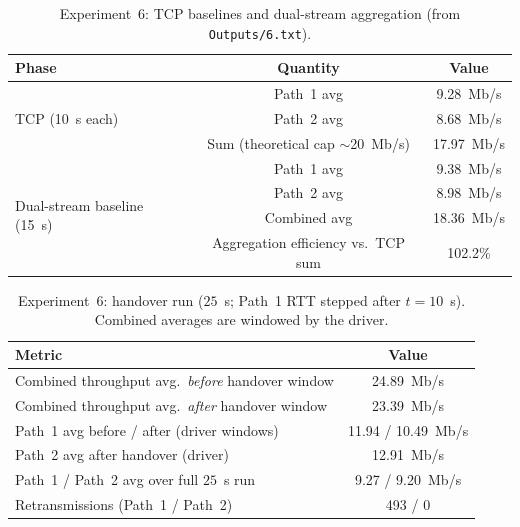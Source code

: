 \begin{table}[htbp]
  \centering
  \caption{Experiment~6: TCP baselines and dual-stream aggregation (from \texttt{Outputs/6.txt}).}
  \label{tab:exp6baseline}
  \begin{tabular}{lcc}
    \toprule
    Phase & Quantity & Value \\
    \midrule
    \multirow{3}{*}{TCP (10~s each)} & Path~1 avg & 9.28~Mb/s \\
     & Path~2 avg & 8.68~Mb/s \\
     & Sum (theoretical cap $\sim$20~Mb/s) & 17.97~Mb/s \\
    \midrule
    \multirow{4}{*}{Dual-stream baseline (15~s)} & Path~1 avg & 9.38~Mb/s \\
     & Path~2 avg & 8.98~Mb/s \\
     & Combined avg & 18.36~Mb/s \\
     & Aggregation efficiency vs.\ TCP sum & 102.2\% \\
    \bottomrule
  \end{tabular}
\end{table}

\begin{table}[htbp]
  \centering
  \caption{Experiment~6: handover run ($25$~s; Path~1 RTT stepped after $t{=}10$~s). Combined averages are windowed by the driver.}
  \label{tab:exp6handover}
  \begin{tabular}{lc}
    \toprule
    Metric & Value \\
    \midrule
    Combined throughput avg.\ \emph{before} handover window & 24.89~Mb/s \\
    Combined throughput avg.\ \emph{after} handover window & 23.39~Mb/s \\
    Path~1 avg before / after (driver windows) & 11.94 / 10.49~Mb/s \\
    Path~2 avg after handover (driver) & 12.91~Mb/s \\
    Path~1 / Path~2 avg over full $25$~s run & 9.27 / 9.20~Mb/s \\
    Retransmissions (Path~1 / Path~2) & 493 / 0 \\
    \bottomrule
  \end{tabular}
\end{table}

